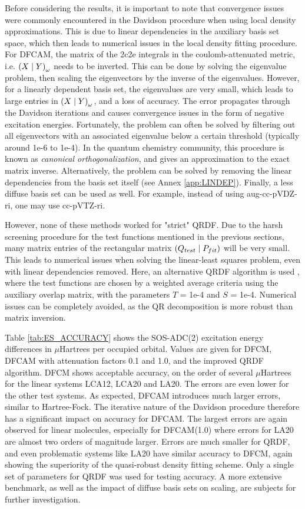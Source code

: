 Before considering the results, it is important to note that convergence issues were commonly encountered in the Davidson procedure when using local density approximations. This is due to linear dependencies in the auxiliary basis set space, which then leads to numerical issues in the local density fitting procedure. For DFCAM, the matrix of the 2c2e integrals in the coulomb-attenuated metric, i.e. $\left( X \mid Y \right)_{\omega}$ needs to be inverted. This can be done by solving the eigenvalue problem, then scaling the eigenvectors by the inverse of the eigenvalues. However, for a linearly dependent basis set, the eigenvalues are very small, which leads to large entries in $\left( X \mid Y \right)_{\omega}$, and a loss of accuracy. The error propagates through the Davidson iterations and causes convergence issues in the form of negative excitation energies. Fortunately, the problem can often be solved by filtering out all eigenvectors with an associated eigenvalue below a certain threshold (typically around 1e-6 to 1e-4). In the quantum chemistry community, this procedure is known as \emph{canonical orthogonalization}, and gives an approximation to the exact matrix inverse. Alternatively, the problem can be solved by removing the linear dependencies from the basis set itself (see Annex \ref{app:LINDEP}). Finally, a less diffuse basis set can be used as well. For example, instead of using aug-cc-pVDZ-ri, one may use cc-pVTZ-ri.

However, none of these methods worked for "strict" QRDF. Due to the harsh screening procedure for the test functions mentioned in the previous sections, many matrix entries of the rectangular matrix $\left( Q_{test} \mid P_{fit} \right)$ will be very small. This leads to numerical issues when solving the linear-least squares problem, even with linear dependencies removed. Here, an alternative QRDF algorithm is used %
, where the test functions are chosen by a weighted average criteria using the auxiliary overlap matrix, with the parameters $T$ = 1e-4 and $S$ = 1e-4. Numerical issues can be completely avoided, as the QR decomposition is more robust than matrix inversion. %

Table \ref{tab:ES_ACCURACY} shows the SOS-ADC(2) excitation energy differences in $\mu$Hartrees per occupied orbital. Values are given for DFCM, DFCAM with attenuation factors 0.1 and 1.0, and the improved QRDF algorithm. DFCM shows acceptable accuracy, on the order of several $\mu$Hartrees for the linear systems LCA12, LCA20 and LA20. The errors are even lower for the other test systems. As expected, DFCAM introduces much larger errors, similar to Hartree-Fock. The iterative nature of the Davidson procedure therefore has a significant impact on accuracy for DFCAM. The largest errors are again observed for linear molecules, especially for DFCAM(1.0) where errors for LA20 are almost two orders of magnitude larger. Errors are much smaller for QRDF, and even problematic systems like LA20 have similar accuracy to DFCM, again showing the superiority of the quasi-robust density fitting scheme. Only a single set of parameters for QRDF was used for testing accuracy. A more extensive benchmark, as well as the impact of diffuse basis sets on scaling, are subjects for further investigation.

